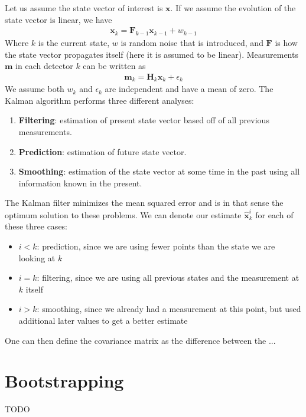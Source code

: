 Let us assume the state vector of interest is $\textbf{x}$. If we assume the evolution of the state vector is linear, we have
\begin{align}
    \textbf{x}_k = \textbf{F}_{k-1}\textbf{x}_{k-1} + w_{k-1}
\end{align}
Where $k$ is the current state, $w$ is random noise that is introduced, and $\textbf{F}$ is how the state vector propagates itself (here it is assumed to be linear). Measurements $\textbf{m}$ in each detector $k$ can be written as
\begin{align}
    \textbf{m}_k = \textbf{H}_k\textbf{x}_k + \epsilon_k
\end{align}
We assume both $w_k$ and $\epsilon_k$ are independent and have a mean of zero. The Kalman algorithm performs three different analyses:
\begin{enumerate}
    \item \textbf{Filtering}: estimation of present state vector based off of all previous measurements.
    \item \textbf{Prediction}: estimation of future state vector.
    \item \textbf{Smoothing}: estimation of the state vector at some time in the past using all information known in the present.
\end{enumerate}
The Kalman filter minimizes the mean squared error and is in that sense the optimum solution to these problems. We can denote our estimate $\hat{\textbf{x}}_k^i$ for each of these three cases:
\begin{itemize}
    \item $i < k$: prediction, since we are using fewer points than the state we are looking at $k$
    \item $i=k$: filtering, since we are using all previous states and the measurement at $k$ itself
    \item $i > k$: smoothing, since we already had a measurement at this point, but used additional later values to get a better estimate
\end{itemize}
One can then define the covariance matrix as the difference between the ...



\section{Bootstrapping}
TODO


